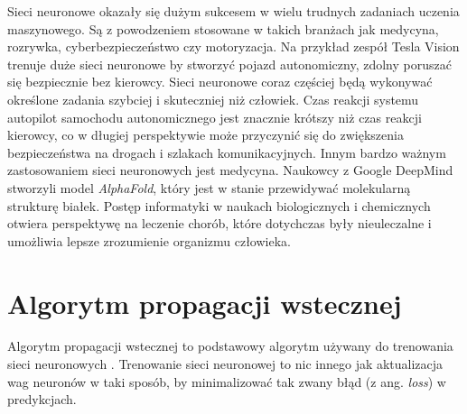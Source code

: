 Sieci neuronowe okazały się dużym sukcesem w wielu trudnych zadaniach uczenia maszynowego.
Są z powodzeniem stosowane w takich branżach jak medycyna, rozrywka, cyberbezpieczeństwo czy motoryzacja. Na przykład zespół Tesla Vision trenuje duże sieci neuronowe by stworzyć pojazd autonomiczny, zdolny poruszać się bezpiecznie bez kierowcy.
Sieci neuronowe coraz częściej będą wykonywać określone zadania szybciej i skuteczniej niż człowiek.
Czas reakcji systemu autopilot samochodu autonomicznego jest znacznie krótszy niż czas reakcji kierowcy, co w długiej perspektywie może przyczynić się do zwiększenia bezpieczeństwa na drogach i szlakach komunikacyjnych.
Innym bardzo ważnym zastosowaniem sieci neuronowych jest medycyna. Naukowcy z Google DeepMind stworzyli model \textit{AlphaFold}, który jest w stanie przewidywać molekularną strukturę białek.
Postęp informatyki w naukach biologicznych i chemicznych otwiera perspektywę na leczenie chorób, które dotychczas były nieuleczalne i umożliwia lepsze zrozumienie organizmu człowieka.


\section{Algorytm propagacji wstecznej}

Algorytm propagacji wstecznej to podstawowy algorytm używany do trenowania sieci neuronowych \cite{geron}.
Trenowanie sieci neuronowej to nic innego jak aktualizacja wag neuronów w taki sposób, by minimalizować tak zwany błąd (z ang. \textit{loss}) w predykcjach.

